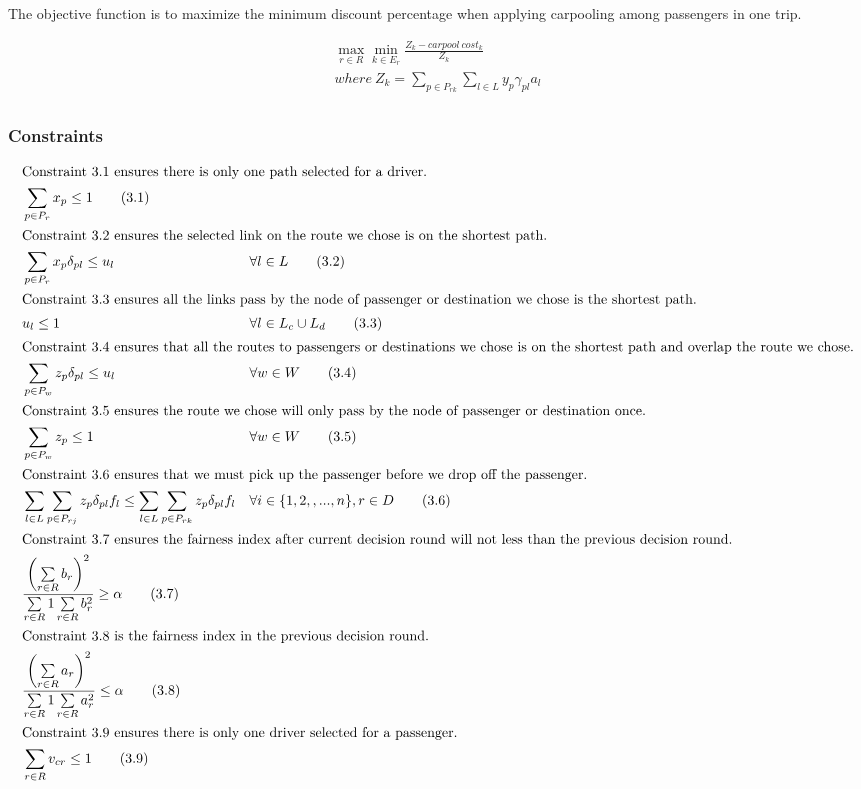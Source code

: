 The objective function is to maximize the minimum discount percentage when applying carpooling among passengers in one trip.

\begin{align*}
  \max_{r \in R} \min_{k \in E_r} \frac{Z_k - carpool\ cost_k}{Z_k} \tag{IP1} \\
  where\ Z_k = \sum_{p \in P_{rk}} \sum_{l \in L} y_p \gamma_{pl} a_l \\
\end{align*}

\subsubsection*{Constraints}

\begin{align*}
  \intertext{Constraint 3.1 ensures there is only one path selected for a driver.}
  & \sum\limits_{p \in P_r} x_p \leq 1 \tag{3.1} \\
  \intertext{Constraint 3.2 ensures the selected link on the route we chose is on the shortest path.}
  & \sum\limits_{p \in P_r} x_p \delta_{pl} \leq u_l && \forall l \in L \tag{3.2} \\
  \intertext{Constraint 3.3 ensures all the links pass by the node of passenger or destination we chose is the shortest path.}
  & u_l \leq 1 && \forall l \in L_c \cup L_d \tag{3.3} \\
  \intertext{Constraint 3.4 ensures that all the routes to passengers or destinations we chose is on the shortest path and overlap the route we chose.}
  & \sum\limits_{p \in P_w} z_p \delta_{pl} \leq u_l && \forall w \in W \tag{3.4} \\
  \intertext{Constraint 3.5 ensures the route we chose will only pass by the node of passenger or destination once.}
  & \sum\limits_{p \in P_w} z_p \leq 1 && \forall w \in W \tag{3.5} \\
  \intertext{Constraint 3.6 ensures that we must pick up the passenger before we drop off the passenger.}
  & \sum\limits_{l \in L} \sum\limits_{p \in P_{rj}} z_p \delta_{pl} f_l \leq \sum\limits_{l \in L} \sum\limits_{p \in P_{rk}} z_p \delta_{pl} f_l && \forall i \in \{1,2,,...,n\}, r \in D \tag{3.6} \\
  \intertext{Constraint 3.7 ensures the fairness index after current decision round will not less than the previous decision round.}
  & \frac{\left(\sum\limits_{r \in R} b_r\right)^2}{\sum\limits_{r \in R} 1 \sum\limits_{r \in R} b_r^2} \geq \alpha \tag{3.7} \\
  \intertext{Constraint 3.8 is the fairness index in the previous decision round.}
  & \frac{\left(\sum\limits_{r \in R} a_r\right)^2}{\sum\limits_{r \in R} 1 \sum\limits_{r \in R} a_r^2} \leq \alpha \tag{3.8} \\
  \intertext{Constraint 3.9 ensures there is only one driver selected for a passenger.}
  & \sum\limits_{r \in R} v_{cr} \leq 1 \tag{3.9} \\
\end{align*}